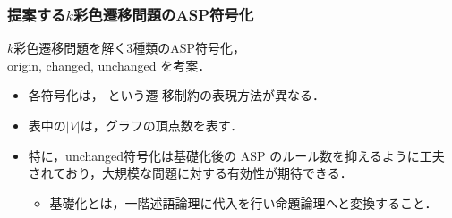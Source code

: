 \documentclass[dvipdfmx,11pt]{beamer}
\begin{document}

\begin{frame}\frametitle{提案する$k$彩色遷移問題のASP符号化}

  \begin{block}{}\centering
    $k$彩色遷移問題を解く3種類のASP符号化，\\origin, changed, unchanged を考案．
  \end{block}

  \begin{itemize}
  \item 各符号化は，
    という遷
    移制約の表現方法が異なる．
  \item 表中の$|V|$は，グラフの頂点数を表す．
  \end{itemize}

  \begin{exampleblock}{}\centering
    
  \end{exampleblock}


  \begin{itemize}
  \item 特に，unchanged符号化は基礎化後の ASP のルール数を抑えるように工夫
    されており，大規模な問題に対する有効性が期待できる．
    \begin{itemize}
      \item 基礎化とは，一階述語論理に代入を行い命題論理へと変換すること．
    \end{itemize}
  \end{itemize}

\end{frame}

\begin{comment}
\begin{frame}\frametitle{ベンチマーク}

  \begin{itemize}
    \item 現時点で組合せ遷移問題は理論面の研究が主流であり, ベンチマークの整備が必要.
    \item 実験においてステップ$t$を与えるとき, その上限値が必要となる.
    \item ステップ$t$の上限値は, グラフ$G$を$k$彩色するときの実行可能解の数と等しい.
  \end{itemize}

  従って, 全解列挙が可能な($G, k$)からベンチマークを生成する必要がある.
  
\end{frame}
\end{comment}
\end{document}
